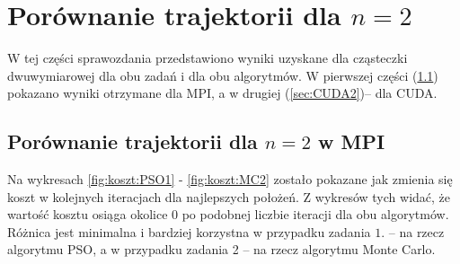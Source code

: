 \documentclass[11pt, a4paper, oneside]{article}
\begin{document}
\section{Porównanie trajektorii dla $n = 2$}
W tej części sprawozdania przedstawiono wyniki uzyskane dla cząsteczki dwuwymiarowej dla obu zadań i dla obu algorytmów. W pierwszej części (\ref{sec:MPI2}) pokazano wyniki otrzymane dla MPI, a w drugiej  (\ref{sec:CUDA2})-- dla CUDA.

\subsection{Porównanie trajektorii dla $n = 2$ w MPI} \label{sec:MPI2}
Na wykresach \ref{fig:koszt:PSO1} - \ref{fig:koszt:MC2} zostało pokazane jak zmienia się koszt w kolejnych iteracjach dla najlepszych położeń. Z wykresów tych widać, że wartość kosztu osiąga okolice $0$ po podobnej liczbie iteracji dla obu algorytmów. Różnica jest minimalna i bardziej korzystna w przypadku zadania $1$. -- na rzecz algorytmu PSO, a w przypadku zadania 2 -- na rzecz algorytmu Monte Carlo.
\end{document}
